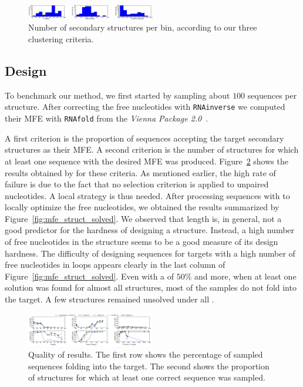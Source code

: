  \begin{figure}[ht!]
 	\centering
	\includegraphics[width=0.5\textwidth]{Figures/bins_distribution.png}
	\caption{Number of secondary structures per bin, according to our three clustering criteria.}
	\label{fig:bins}
 \end{figure}
 
 
\subsection{Design}
 To benchmark our method, we first started by sampling about $100$ sequences per structure. After correcting the free nucleotides with
 \texttt{RNAinverse} we computed their MFE with \texttt{RNAfold} from the \textit{Vienna Package 2.0}~\cite{Hofacker:1994}.
 
A first criterion is the proportion of sequences accepting the target
secondary structures as their MFE. A second criterion is the number of structures
for which at least one sequence with the desired MFE was produced.
Figure~\ref{fig:mfe_struct_solved_noinverse} shows the results obtained by \ourprog for these criteria. As mentioned earlier, the high rate of failure
is due to the fact that no selection criterion is applied to
unpaired nucleotides. A local strategy is thus needed.
After processing \ourprog sequences with \RNAinverse to 
locally optimize the free nucleotides, we obtained the results 
summarized by Figure~\ref{fig:mfe_struct_solved}. We observed
that length is, in general, not a good predictor for the hardness of designing a structure. 
Instead, a high number of free nucleotides in the structure seems to be a 
good measure of its design hardness. 
 The difficulty of 
designing sequences for targets with a high number of free nucleotides 
 in loops appears clearly in the last column of Figure~\ref{fig:mfe_struct_solved}.
Even with a \GCContent of $50\%$ and more, when at least
one solution was found for almost all structures, most of the samples 
do not fold into the target. A few structures remained unsolved under
all \GCContent.


\begin{figure}[ht!]	
	\centering
	\includegraphics[width=0.5\textwidth]{Figures/mfe_struct_solve_nornainverse.png}
	\caption{Quality of \ourprog results. The first row shows the percentage
	of sampled sequences folding into the target. The second shows the 	
	proportion	of structures for which at least one correct sequence was 
	sampled.}
	\label{fig:mfe_struct_solved_noinverse}	
\end{figure}



